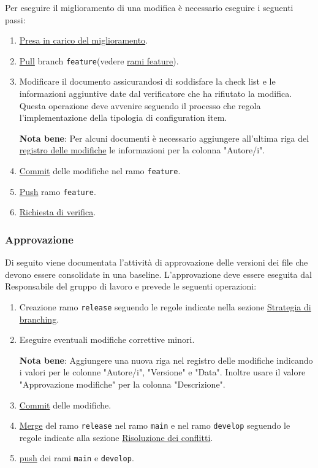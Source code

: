 Per eseguire il miglioramento di una modifica è necessario eseguire i seguenti passi:
\begin{enumerate}
\item \hyperref[subpar:presa_carico_modifica]{Presa in carico del miglioramento}.

\item \hyperref[subpar:pull]{Pull} branch \texttt{feature}(vedere \hyperref[item:rami_feature]{rami feature}).

\item Modificare il documento assicurandosi di soddisfare la check list e le informazioni aggiuntive date dal verificatore che ha rifiutato la modifica.
Questa operazione deve avvenire seguendo il processo che regola l'implementazione della tipologia di configuration item.

\textbf{Nota bene}: Per alcuni documenti è necessario aggiungere all'ultima riga del \hyperref[par:registro_delle_modifiche]{registro delle modifiche} le informazioni per la colonna "Autore/i". 

\item \hyperref[subpar:commit]{Commit} delle modifiche nel ramo \texttt{feature}.

\item \hyperref[subpar:push]{Push} ramo \texttt{feature}.

\item \hyperref[subpar:github_richiesta_di_verifica]{Richiesta di verifica}.
\end{enumerate}

\subsubsection{Approvazione}
Di seguito viene documentata l'attività di approvazione delle versioni dei file che devono essere consolidate in una baseline.
L'approvazione deve essere eseguita dal Responsabile del gruppo di lavoro e prevede le seguenti operazioni:
\begin{enumerate}
    \item Creazione ramo \texttt{release} seguendo le regole indicate nella sezione \hyperref[subpar:strategia_di_branching_documenti]{Strategia di branching}.
    \item Eseguire eventuali modifiche correttive minori.
    
    \textbf{Nota bene}: Aggiungere una nuova riga nel registro delle modifiche indicando i valori per le colonne "Autore/i", "Versione" e "Data".
    Inoltre usare il valore "Approvazione modifiche" per la colonna "Descrizione".

    \item \hyperref[subpar:commit]{Commit} delle modifiche.
    \item \hyperref[subpar:merge]{Merge} del ramo \texttt{release} nel ramo \texttt{main} e nel ramo \texttt{develop} seguendo le regole indicate alla sezione \hyperref[subpar:risoluzione_dei_conflitti]{Risoluzione dei conflitti}.
    \item \hyperref[subpar:push]{push} dei rami \texttt{main} e \texttt{develop}.
\end{enumerate}

